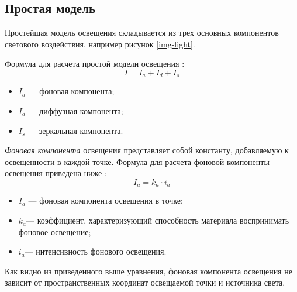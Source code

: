 \subsection{Простая модель}

Простейшая модель освещения складывается из трех основных компонентов светового воздействия, например рисунок \ref{img-light}.


Формула для расчета простой модели освещения \cite{lightmodf}:
\begin{equation}
 I = I_{a} + I_{d} + I_{s}
\end{equation}
	
\begin{itemize}
	\item $I_{a}$ --- фоновая компонента;
	\item $I_{d}$ --- диффузная компонента;
	\item $I_{s}$ --- зеркальная компонента.
\end{itemize}

\textit{Фоновая компонента} освещения представляет собой константу, добавляемую к освещенности в каждой точке. Формула для расчета фоновой компоненты освещения приведена ниже \cite{lightmodf} : \begin{equation}
	I_{a}=k_{a} \cdot i_{a}
\end{equation}
\begin{itemize}
	\item $I_{a}$ --- фоновая компонента освещения в точке;
	\item $k_{a}$​ --- коэффициент, характеризующий способность материала воспринимать фоновое освещение;
	\item $i_{a}$​ --- интенсивность фонового освещения.
\end{itemize}

Как видно из приведенного выше уравнения, фоновая компонента освещения не зависит от пространственных координат освещаемой точки и источника света.

%
%
%
%

